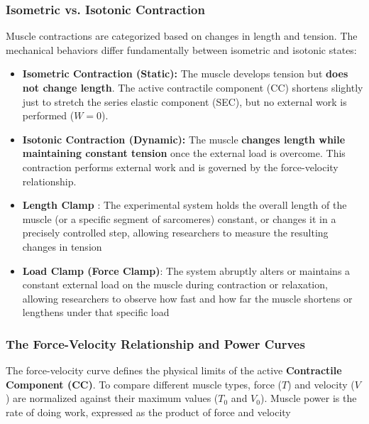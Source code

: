 \documentclass{article}
\begin{document}
\subsubsection{Isometric vs. Isotonic Contraction}
Muscle contractions are categorized based on changes in length and tension. The mechanical behaviors differ fundamentally between isometric and isotonic states:

\begin{itemize}
    \item \textbf{Isometric Contraction (Static):} The muscle develops tension but \textbf{does not change length}. The active contractile component (CC) shortens slightly just to stretch the series elastic component (SEC), but no external work is performed ($W = 0$).
    \item \textbf{Isotonic Contraction (Dynamic):} The muscle \textbf{changes length while maintaining constant tension} once the external load is overcome. This contraction performs external work and is governed by the force-velocity relationship.
    \item \textbf{Length Clamp} : The experimental system holds the overall length of the muscle (or a specific segment of sarcomeres) constant, or changes it in a precisely controlled step, allowing researchers to measure the resulting changes in tension
    \item \textbf{Load Clamp (Force Clamp)}: The system abruptly alters or maintains a constant external load on the muscle during contraction or relaxation, allowing researchers to observe how fast and how far the muscle shortens or lengthens under that specific load

\end{itemize}


\subsubsection{The Force-Velocity Relationship and Power Curves}
The force-velocity curve defines the physical limits of the active \textbf{Contractile Component (CC)}. To compare different muscle types, force ($T$) and velocity ($V$) are normalized against their maximum values ($T_0$ and $V_0$). Muscle power is the rate of doing work, expressed as the product of force and velocity
\end{document}
